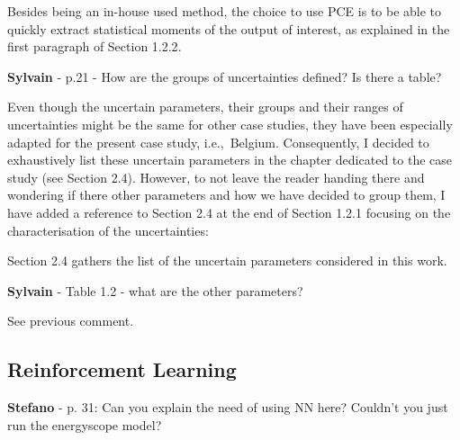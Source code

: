 \documentclass[12pt,a4paper]{article}
\def\ie{i.e.,\ }
\begin{document}
\noindent Besides being an in-house used method, the choice to use PCE is to be able to quickly extract statistical moments of the output of interest, as explained {\color{blue}in the first paragraph of Section 1.2.2}.

\begin{mdframed}[style=comment] %
{\color{purple} \textbf{Sylvain}} - p.21 - How are the groups of uncertainties defined? Is there a table?
\end{mdframed}

\noindent Even though the uncertain parameters, their groups and their ranges of uncertainties might be the same for other case studies, they have been especially adapted for the present case study, \ie Belgium. Consequently, I decided to exhaustively list these uncertain parameters in the chapter dedicated to the case study (see Section 2.4). However, to not leave the reader handing there and wondering if there other parameters and how we have decided to group them, I have added a reference to Section 2.4 {\color{blue}at the end of Section 1.2.1} focusing on the characterisation of the uncertainties:

\begin{mdframed}[style=manuscript] %
Section 2.4 gathers the list of the uncertain parameters considered in this work.
\end{mdframed}

\begin{mdframed}[style=comment] %
{\color{purple} \textbf{Sylvain}} - Table 1.2 - what are the other parameters?
\end{mdframed}

\noindent See previous comment.

\subsection{Reinforcement Learning}
\label{methodo_RL}

\begin{mdframed}[style=comment] %
{\color{orange} \textbf{Stefano}} - p. 31: Can you explain the need of using NN here? Couldn’t you just run the energyscope model?
\end{mdframed}

\noindent 

\begin{mdframed}[style=manuscript] %

\end{mdframed}
\end{document}
